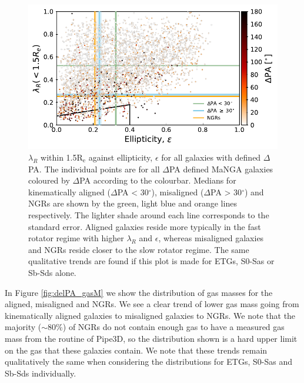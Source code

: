 \begin{figure}
    \centering
	\includegraphics[width=\linewidth]{thesis/latex/misalignment_MaNGA/delPA_lambda_Re.pdf}
    \caption{$\lambda_R$ within 1.5$\mathrm{R_e}$ against ellipticity, $\epsilon$ for all galaxies with defined $\Delta$PA. The individual points are for all $\Delta$PA defined MaNGA galaxies coloured by $\Delta$PA according to the colourbar. Medians for kinematically aligned ($\Delta$PA < 30$^{\circ}$), misaligned ($\Delta$PA > 30$^{\circ}$) and NGRs are shown by the green, light blue and orange lines respectively. The lighter shade around each line corresponds to the standard error. Aligned galaxies reside more typically in the fast rotator regime with higher $\lambda_R$ and $\epsilon$, whereas misaligned galaxies and NGRs reside closer to the slow rotator regime. The same qualitative trends are found if this plot is made for ETGs, S0-Sas or Sb-Sds alone.}
    \label{fig:delPA_lambda_Re}
\end{figure}

In Figure \ref{fig:delPA_gasM} we show the distribution of gas masses for the aligned, misaligned and NGRs. We see a clear trend of lower gas mass going from kinematically aligned galaxies to misaligned galaxies to NGRs. We note that the majority ($\sim$80\%) of NGRs do not contain enough gas to have a measured gas mass from the routine of Pipe3D, so the distribution shown is a hard upper limit on the gas that these galaxies contain. We note that these trends remain qualitatively the same when considering the distributions for ETGs, S0-Sas and Sb-Sds individually.

